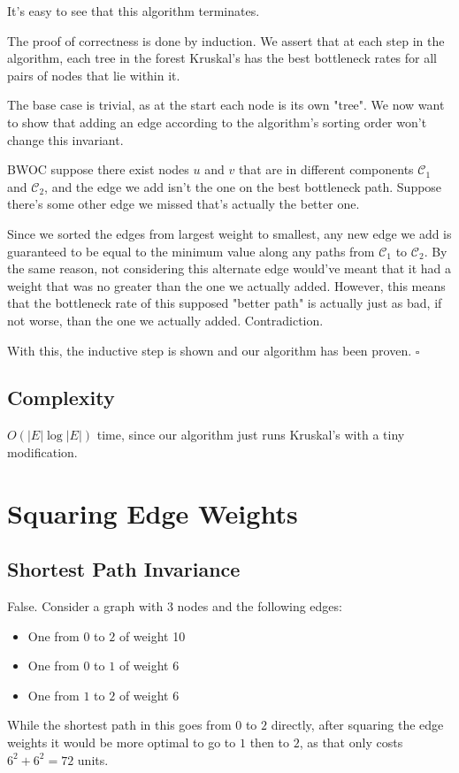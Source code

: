 \documentclass[12pt]{article}
\begin{document}
It's easy to see that this algorithm terminates.

The proof of correctness is done by induction.
We assert that at each step in the algorithm, each tree in the forest
Kruskal's has the best bottleneck rates for all pairs of nodes that
lie within it.

The base case is trivial, as at the start each node is its own "tree".
We now want to show that adding an edge according to the algorithm's
sorting order won't change this invariant.

BWOC suppose there exist nodes $u$ and $v$ that are in different components
$\mathcal{C}_1$ and $\mathcal{C}_2$, and the edge we add isn't the one on the best bottleneck path.
Suppose there's some other edge we missed that's actually the better one.

Since we sorted the edges from largest weight to smallest, any new edge we add
is guaranteed to be equal to the minimum value along any paths from $\mathcal{C}_1$ to $\mathcal{C}_2$.
By the same reason, not considering this alternate edge would've meant that
it had a weight that was no greater than the one we actually added.
However, this means that the bottleneck rate of this supposed "better path"
is actually just as bad, if not worse, than the one we actually added.
Contradiction.

With this, the inductive step is shown and our algorithm has been proven. $\square$

\subsection{Complexity}

$\boxed{O(|E| \log |E|)}$ time, since our algorithm just runs Kruskal's with a tiny modification.

\pagebreak

\section{Squaring Edge Weights}

\subsection{Shortest Path Invariance}

False. Consider a graph with 3 nodes and the following edges:
\begin{itemize}[nolistsep]
    \item One from $0$ to $2$ of weight 10
    \item One from $0$ to $1$ of weight 6
    \item One from $1$ to $2$ of weight 6
\end{itemize}
While the shortest path in this goes from $0$ to $2$ directly,
after squaring the edge weights it would be more optimal
to go to $1$ then to $2$, as that only costs $6^2+6^2=72$ units.
\end{document}
